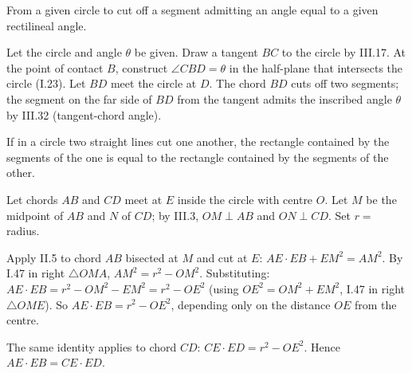\begin{claim}
\label{prop:III.34}
From a given circle to cut off a segment admitting an angle equal to
a given rectilineal angle.
\end{claim}
\begin{evidence}
\label{ev:III.34}
Let the circle and angle $\theta$ be given.  Draw a tangent $BC$
to the circle by III.17.  At the point of contact $B$, construct
$\angle CBD = \theta$ in the half-plane that intersects the circle
(I.23).  Let $BD$ meet the circle at $D$.  The chord $BD$ cuts off
two segments; the segment on the far side of $BD$ from the tangent
admits the inscribed angle $\theta$ by III.32 (tangent-chord
angle).
\end{evidence}

\begin{claim}
\label{prop:III.35}
If in a circle two straight lines cut one another, the rectangle
contained by the segments of the one is equal to the rectangle
contained by the segments of the other.
\end{claim}
\begin{evidence}
\label{ev:III.35}
Let chords $AB$ and $CD$ meet at $E$ inside the circle with centre
$O$.  Let $M$ be the midpoint of $AB$ and $N$ of $CD$; by III.3,
$OM \perp AB$ and $ON \perp CD$.  Set $r = $ radius.

Apply II.5 to chord $AB$ bisected at $M$ and cut at $E$: $AE
\cdot EB + EM^2 = AM^2$.  By I.47 in right $\triangle OMA$,
$AM^2 = r^2 - OM^2$.  Substituting: $AE\cdot EB = r^2 - OM^2 -
EM^2 = r^2 - OE^2$ (using $OE^2 = OM^2 + EM^2$, I.47 in right
$\triangle OME$).  So $AE \cdot EB = r^2 - OE^2$, depending only
on the distance $OE$ from the centre.

The same identity applies to chord $CD$: $CE \cdot ED = r^2 -
OE^2$.  Hence $AE \cdot EB = CE \cdot ED$.
\end{evidence}

